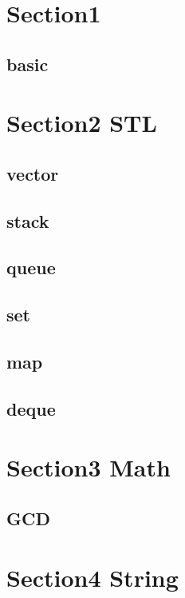 \section{Section1}
    \subsection{basic}
        
        
\section{Section2 STL}
    \subsection{vector}
        
    \subsection{stack}
        
    \subsection{queue}
        
    \subsection{set}
        
    \subsection{map}
        
    \subsection{deque}
        

\section{Section3 Math}
    \subsection{GCD}
            

\section{Section4 String}
